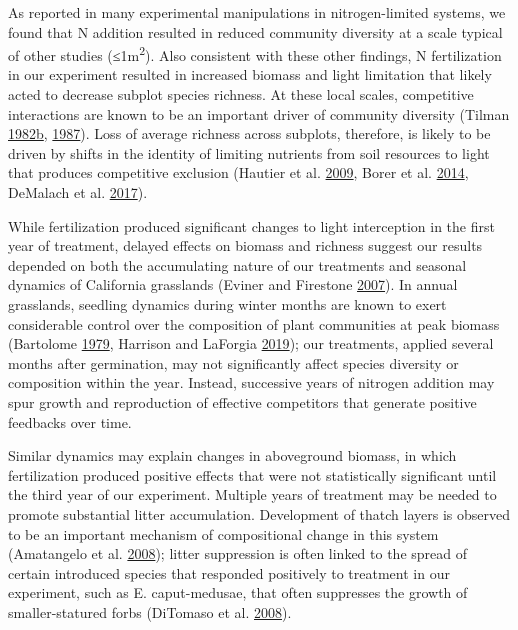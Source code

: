 \documentclass[twoside,12pt,final]{ucthesis-CA2012}
\begin{document}
\begin{ucmainmatter}
As reported in many experimental manipulations in nitrogen-limited systems, we found that N addition resulted in reduced community diversity at a scale typical of other studies (≤1m\textsuperscript{2}). Also consistent with these other findings, N fertilization in our experiment resulted in increased biomass and light limitation that likely acted to decrease subplot species richness. At these local scales, competitive interactions are known to be an important driver of community diversity (Tilman \protect\hyperlink{ref-Tilman1982}{1982}\protect\hyperlink{ref-Tilman1982}{b}, \protect\hyperlink{ref-tilman1987}{1987}). Loss of average richness across subplots, therefore, is likely to be driven by shifts in the identity of limiting nutrients from soil resources to light that produces competitive exclusion (Hautier et al. \protect\hyperlink{ref-Hautier2009}{2009}, Borer et al. \protect\hyperlink{ref-Borer2014a}{2014}, DeMalach et al. \protect\hyperlink{ref-DeMalach2017a}{2017}).

While fertilization produced significant changes to light interception in the first year of treatment, delayed effects on biomass and richness suggest our results depended on both the accumulating nature of our treatments and seasonal dynamics of California grasslands (Eviner and Firestone \protect\hyperlink{ref-eviner2007}{2007}). In annual grasslands, seedling dynamics during winter months are known to exert considerable control over the composition of plant communities at peak biomass (Bartolome \protect\hyperlink{ref-bartolome1979}{1979}, Harrison and LaForgia \protect\hyperlink{ref-harrison2019}{2019}); our treatments, applied several months after germination, may not significantly affect species diversity or composition within the year. Instead, successive years of nitrogen addition may spur growth and reproduction of effective competitors that generate positive feedbacks over time.

Similar dynamics may explain changes in aboveground biomass, in which fertilization produced positive effects that were not statistically significant until the third year of our experiment. Multiple years of treatment may be needed to promote substantial litter accumulation. Development of thatch layers is observed to be an important mechanism of compositional change in this system (Amatangelo et al. \protect\hyperlink{ref-amatangelo2008}{2008}); litter suppression is often linked to the spread of certain introduced species that responded positively to treatment in our experiment, such as E. caput-medusae, that often suppresses the growth of smaller-statured forbs (DiTomaso et al. \protect\hyperlink{ref-DiTomaso2008}{2008}).


\end{ucmainmatter}
\end{document}
